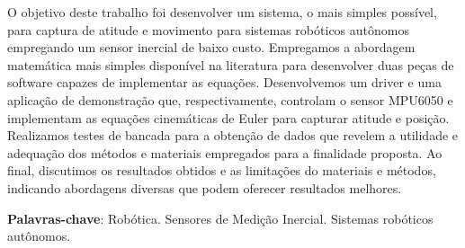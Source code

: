 \begin{resumo}[RESUMO]
\begin{SingleSpacing}


    O objetivo deste trabalho foi desenvolver um sistema, o mais simples possível, para captura de atitude e movimento para sistemas robóticos autônomos empregando um sensor inercial de baixo custo.
    Empregamos a abordagem matemática mais simples disponível na literatura para desenvolver duas peças de software capazes de implementar as equações.
    Desenvolvemos um driver e uma aplicação de demonstração que, respectivamente, controlam o sensor MPU6050 e implementam as equações cinemáticas de Euler para capturar atitude e posição.
    Realizamos testes de bancada para a obtenção de dados que revelem a utilidade e adequação dos métodos e materiais empregados para a finalidade proposta.
    Ao final, discutimos os resultados obtidos e as limitações do materiais e métodos, indicando abordagens diversas que podem oferecer resultados melhores.

    \textbf{Palavras-chave}: Robótica. Sensores de Medição Inercial. Sistemas
    robóticos autônomos.

\end{SingleSpacing}
\end{resumo}

